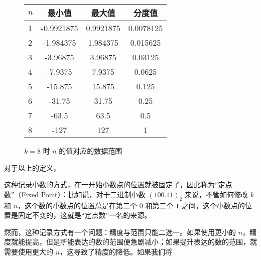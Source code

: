         \begin{figure}
            \centering
            \begin{tabular}{lS[table-format=-3.7]S[table-format=-3.7]S[table-format=-3.7]}
                $n$ & 最小值     & 最大值    & 分度值    \\    & -0.9921875 & 0.9921875  & 0.0078125 \\
                2   & -1.984375  & 1.984375   & 0.015625  \\
                3   & -3.96875   & 3.96875    & 0.03125   \\
                4   & -7.9375    & 7.9375     & 0.0625    \\
                5   & -15.875    & 15.875     & 0.125     \\
                6   & -31.75     & 31.75      & 0.25      \\
                7   & -63.5      & 63.5       & 0.5       \\
                8   & -127       & 127        & 1         \\
            \end{tabular}
            \caption{$k = 8$ 时 $n$ 的值对应的数据范围}
            \label{fig:NumberSystemBasics/FixedPointAndFloatingPoint/FixedPoint/DataRange}
        \end{figure}

        对于以上的定义，

        这种记录小数的方式，在一开始小数点的位置就被固定了，因此称为“定点数”（Fixed Point）：比如说，对于二进制小数 $(100.11)_2$ 来说，不管如何修改 $k$ 和 $n$，这个数的小数点的位置总是在第二个 $0$ 和第二个 $1$ 之间，这个小数点的位置是固定不变的，这就是“定点数”一名的来源。

        然而，这种记录方式有一个问题：精度与范围只能二选一。如果使用更小的 $n$，精度就能提高，但是所能表达的数的范围便急剧减小；如果提升表达的数的范围，就需要使用更大的 $n$，这导致了精度的降低。如果我们将
